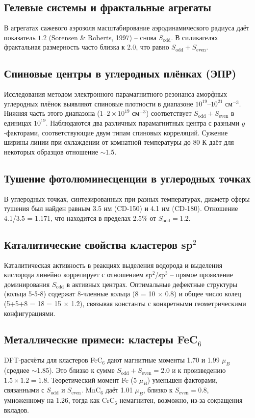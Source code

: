 \documentclass[12pt,a4paper]{article}
\begin{document}
	\subsection{Гелевые системы и фрактальные агрегаты}
	В агрегатах сажевого аэрозоля масштабирование аэродинамического радиуса даёт показатель \(1.2\) (Sorensen \& Roberts, 1997) -- снова \(S_{\text{odd}}\). В силикагелях фрактальная размерность часто близка к 2.0, что равно \(S_{\text{odd}}+S_{\text{even}}\).
	
	\subsection{Спиновые центры в углеродных плёнках (ЭПР)}
	Исследования методом электронного парамагнитного резонанса аморфных углеродных плёнок выявляют спиновые плотности в диапазоне \(10^{19}\)--\(10^{21}\) см\({}^{-3}\). Нижняя часть этого диапазона (\(1\)--\(2\times10^{19}\) см\({}^{-3}\)) соответствует \(S_{\text{odd}}+S_{\text{even}}\) в единицах \(10^{19}\). Наблюдаются два различных парамагнитных центра с разными \(g\)-факторами, соответствующие двум типам спиновых корреляций. Сужение ширины линии при охлаждении от комнатной температуры до 80 К даёт для некоторых образцов отношение \(\sim 1.5\).
	
	\subsection{Тушение фотолюминесценции в углеродных точках}
	В углеродных точках, синтезированных при разных температурах, диаметр сферы тушения был найден равным 3.5 нм (CD-150) и 4.1 нм (CD-180). Отношение 4.1/3.5 = 1.171, что находится в пределах 2.5\% от \(S_{\text{odd}}=1.2\).
	
	\subsection{Каталитические свойства кластеров sp\({}^2\)}
	Каталитическая активность в реакциях выделения водорода и выделения кислорода линейно коррелирует с отношением sp\({}^2\)/sp\({}^3\) -- прямое проявление доминирования \(S_{\text{odd}}\) в активных центрах. Оптимальные дефектные структуры (кольца 5-5-8) содержат 8-членные кольца (8 = 10 \(\times\) 0.8) и общее число колец (5+5+8 = 18 = 15 \(\times\) 1.2), связывая константы с конкретными геометрическими конфигурациями.
	
	\subsection{Металлические примеси: кластеры FeC\({}_6\)}
	DFT-расчёты для кластеров FeC\({}_6\) дают магнитные моменты 1.70 и 1.99 \(\mu_B\) (среднее \(\sim\)1.85). Это близко к сумме \(S_{\text{odd}}+S_{\text{even}}=2.0\) и к произведению \(1.5\times1.2=1.8\). Теоретический момент Fe (5 \(\mu_B\)) уменьшен факторами, связанными с \(S_{\text{odd}}\) и \(S_{\text{even}}\). MnC\({}_6\) даёт 1.01 \(\mu_B\), близко к \(S_{\text{even}}=0.8\), умноженному на 1.26, тогда как CrC\({}_6\) немагнитен, возможно, из-за сокращения вкладов.
	
\end{document}
